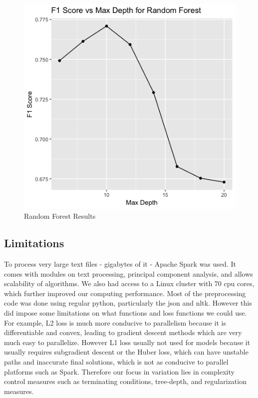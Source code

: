 \documentclass[letterpaper, 12 pt, conference]{ieeeconf}  %
\begin{document}
\begin{figure}[h]
	\centering
	\includegraphics[scale=0.4]		
    {rf_result.png}
	\caption{Random Forest Results}
    \label{rf_result}
\end{figure}

\subsection{Limitations}
To process very large text files - gigabytes of it - Apache Spark was used. It comes with modules on text processing, principal component analysis, and allows scalability of algorithms. We also had access to a Linux cluster with 70 cpu cores, which further improved our computing performance. Most of the preprocessing code was done using regular python, particularly the json and nltk. However this did impose some limitations on what functions and loss functions we could use. For example, L2 loss is much more conducive to parallelism because it is differentiable and convex, leading to gradient descent methods which are very much easy to parallelize. However L1 loss usually not used for models because it usually requires subgradient descent or the Huber loss, which can have unstable paths and inaccurate final solutions, which is not as conducive to parallel platforms such as Spark. Therefore our focus in variation lies in complexity control measures such as terminating conditions, tree-depth, and regularization measures. 
\end{document}

